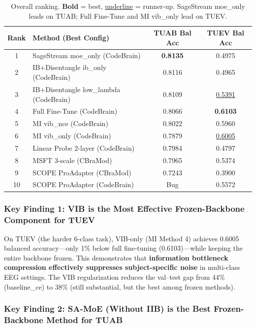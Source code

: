 \documentclass{article}
\begin{document}
\begin{table}[h]
\centering
\small
\begin{tabular}{@{}clcc@{}}
\toprule
Rank & Method (Best Config) & TUAB Bal Acc & TUEV Bal Acc \\
\midrule
1 & SageStream moe\_only (CodeBrain) & \textbf{0.8135} & 0.4975 \\
2 & IB+Disentangle ib\_only (CodeBrain) & 0.8116 & 0.4965 \\
3 & IB+Disentangle low\_lambda (CodeBrain) & 0.8109 & \underline{0.5391} \\
4 & Full Fine-Tune (CodeBrain) & 0.8066 & \textbf{0.6103} \\
5 & MI vib\_nce (CodeBrain) & 0.8022 & 0.5960 \\
6 & MI vib\_only (CodeBrain) & 0.7879 & \underline{0.6005} \\
7 & Linear Probe 2-layer (CodeBrain) & 0.7984 & 0.4797 \\
8 & MSFT 3-scale (CBraMod) & 0.7965 & 0.5374 \\
9 & SCOPE ProAdapter (CBraMod) & 0.7243 & 0.3900 \\
10 & SCOPE ProAdapter (CodeBrain) & Bug & 0.5572 \\
\bottomrule
\end{tabular}
\caption{Overall ranking. \textbf{Bold} = best, \underline{underline} = runner-up. SageStream moe\_only leads on TUAB; Full Fine-Tune and MI vib\_only lead on TUEV.}
\label{tab:ranking}
\end{table}

\subsubsection{Key Finding 1: VIB is the Most Effective Frozen-Backbone Component for TUEV}

On TUEV (the harder 6-class task), VIB-only (MI Method 4) achieves 0.6005 balanced accuracy---only 1\% below full fine-tuning (0.6103)---while keeping the entire backbone frozen. This demonstrates that \textbf{information bottleneck compression effectively suppresses subject-specific noise} in multi-class EEG settings. The VIB regularization reduces the val--test gap from 44\% (baseline\_ce) to 38\% (still substantial, but the best among frozen methods).

\subsubsection{Key Finding 2: SA-MoE (Without IIB) is the Best Frozen-Backbone Method for TUAB}
\end{document}

